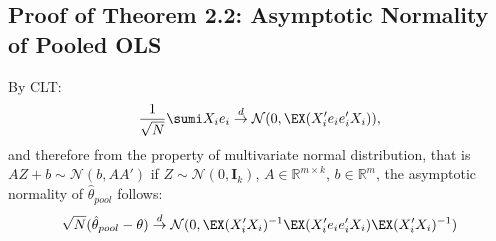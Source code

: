 \subsection{Proof of Theorem 2.2: Asymptotic Normality of Pooled OLS}
By CLT:
\begin{align*}
    \dfrac{1}{\sqrt{N}} \sumi X_i e_i \overset{d}{\to} \mathcal{N}(0,\EX(X_i'e_ie_i'X_i)),
\end{align*}
and therefore from the property of multivariate normal distribution, that is $AZ + b \sim \mathcal{N}(b,AA')$ if $Z \sim \mathcal{N}(0,\textbf{I}_k)$, $A \in \mathbb{R}^{m\times k}$, $b \in \mathbb{R}^m$, the asymptotic normality of $\hat\theta_{pool}$ follows: 
\begin{align*}
    \sqrt{N}(\hat\theta_{pool} - \theta) \overset{d}{\to} \mathcal{N}(0,\EX(X_i'X_i)^{-1}\EX(X_i'e_ie_i'X_i)\EX(X_i'X_i)^{-1})
\end{align*}